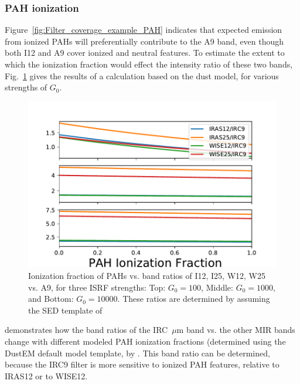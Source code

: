       \subsubsection{PAH ionization}
      Figure~\ref{fig:Filter_coverage_example_PAH} indicates that expected emission from ionized PAHs will preferentially contribute to the A9 band, even though both I12 and A9 cover ionized and neutral features. To estimate the extent to which the ionization fraction would effect the intensity ratio of these two bands, Fig.~\ref{fig:inband_ionfrac_ratios} gives the results of a calculation based on the \cite{drli01} dust model, for various strengths of $G_{0}$.
        \begin{figure}
            \centering
            \includegraphics[width=150mm]{../Plots/band-ratio-multiple.pdf}
            \caption{Ionization fraction of PAHs vs. band ratios of I12, I25, W12, W25 vs. A9, for three ISRF strengths: Top: $G_{0} = 100$, Middle: $G_{0} = 1000$, and Bottom: $G_{0} = 10000$. These ratios are determined by assuming the SED template of \cite{dustem11} }
            \label{fig:inband_ionfrac_ratios}
        \end{figure}
         demonstrates how the band ratios of the IRC~$\mu$m band vs. the other MIR bands change with different modeled PAH ionization fractions (determined using the DustEM default model template, by \cite{dustem11}. This band ratio can be determined, because the IRC9 filter is more sensitive to ionized PAH features, relative to IRAS12 or to WISE12.
